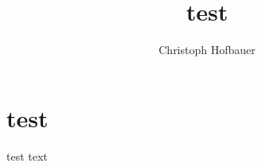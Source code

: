 \documentclass[]{article}
\author{Christoph Hofbauer}
\title{test}
\begin{document}
	
	
\noindent	
\section{test}
test text



\end{document}

